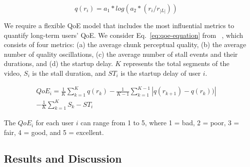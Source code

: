 $$
q(r_i) = a_1 * log(a_2 * (r_i/ r_{|L|}))
$$

We require a flexible QoE model that includes the most influential metrics to quantify long-term users' QoE. 
We consider Eq.~\ref{eq:qoe-equation} from ~\cite{Reichl:TSys2013}, which consists of four metrics: (a) the average chunk perceptual quality, (b) the average number of quality oscillations, (c) the average number of stall events and their durations, and (d) the startup delay. $K$ represents the total segments of the video, $S_{i}$ is the stall duration, and $ST_{i}$ is the startup delay of user $i$.

\begin{equation}\label{eq:qoe-equation}
\begin{split}
QoE_i = \frac{1}{K} \sum_{k=1}^{K}q(r_{k}) - \frac{1}{K-1} \sum_{k=1}^{K-1}|q(r_{k+1}) - q(r_{k}))| \\
- \frac{1}{K}\sum_{k=1}^{K} S_{k} - ST_{i}
\end{split}
\end{equation}

The $QoE_{i}$ for each user $i$ can range from 1 to 5, where 1 = bad, 2 = poor, 3 = fair, 4 = good, and 5 = excellent.

%

\subsection{Results and Discussion}


